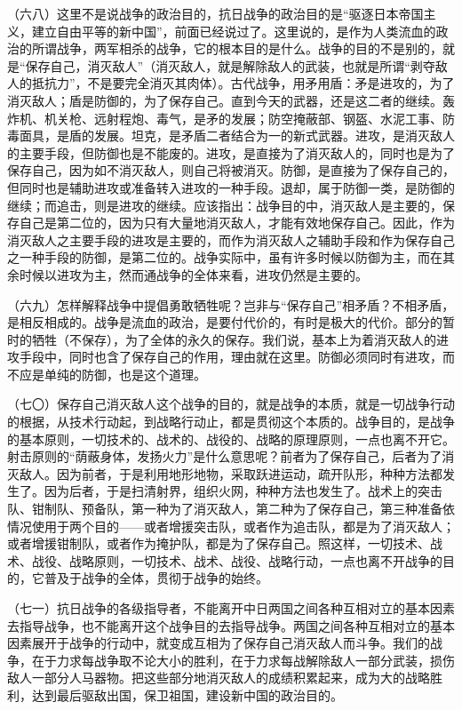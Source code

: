 （六八）这里不是说战争的政治目的，抗日战争的政治目的是“驱逐日本帝国主义，建立自由平等的新中国”，前面已经说过了。这里说的，是作为人类流血的政治的所谓战争，两军相杀的战争，它的根本目的是什么。战争的目的不是别的，就是“保存自己，消灭敌人”（消灭敌人，就是解除敌人的武装，也就是所谓“剥夺敌人的抵抗力”，不是要完全消灭其肉体）。古代战争，用矛用盾：矛是进攻的，为了消灭敌人；盾是防御的，为了保存自己。直到今天的武器，还是这二者的继续。轰炸机、机关枪、远射程炮、毒气，是矛的发展；防空掩蔽部、钢盔、水泥工事、防毒面具，是盾的发展。坦克，是矛盾二者结合为一的新式武器。进攻，是消灭敌人的主要手段，但防御也是不能废的。进攻，是直接为了消灭敌人的，同时也是为了保存自己，因为如不消灭敌人，则自己将被消灭。防御，是直接为了保存自己的，但同时也是辅助进攻或准备转入进攻的一种手段。退却，属于防御一类，是防御的继续；而追击，则是进攻的继续。应该指出：战争目的中，消灭敌人是主要的，保存自己是第二位的，因为只有大量地消灭敌人，才能有效地保存自己。因此，作为消灭敌人之主要手段的进攻是主要的，而作为消灭敌人之辅助手段和作为保存自己之一种手段的防御，是第二位的。战争实际中，虽有许多时候以防御为主，而在其余时候以进攻为主，然而通战争的全体来看，进攻仍然是主要的。

（六九）怎样解释战争中提倡勇敢牺牲呢？岂非与“保存自己”相矛盾？不相矛盾，是相反相成的。战争是流血的政治，是要付代价的，有时是极大的代价。部分的暂时的牺牲（不保存），为了全体的永久的保存。我们说，基本上为着消灭敌人的进攻手段中，同时也含了保存自己的作用，理由就在这里。防御必须同时有进攻，而不应是单纯的防御，也是这个道理。

（七〇）保存自己消灭敌人这个战争的目的，就是战争的本质，就是一切战争行动的根据，从技术行动起，到战略行动止，都是贯彻这个本质的。战争目的，是战争的基本原则，一切技术的、战术的、战役的、战略的原理原则，一点也离不开它。射击原则的“荫蔽身体，发扬火力”是什么意思呢？前者为了保存自己，后者为了消灭敌人。因为前者，于是利用地形地物，采取跃进运动，疏开队形，种种方法都发生了。因为后者，于是扫清射界，组织火网，种种方法也发生了。战术上的突击队、钳制队、预备队，第一种为了消灭敌人，第二种为了保存自己，第三种准备依情况使用于两个目的——或者增援突击队，或者作为追击队，都是为了消灭敌人；或者增援钳制队，或者作为掩护队，都是为了保存自己。照这样，一切技术、战术、战役、战略原则，一切技术、战术、战役、战略行动，一点也离不开战争的目的，它普及于战争的全体，贯彻于战争的始终。

（七一）抗日战争的各级指导者，不能离开中日两国之间各种互相对立的基本因素去指导战争，也不能离开这个战争目的去指导战争。两国之间各种互相对立的基本因素展开于战争的行动中，就变成互相为了保存自己消灭敌人而斗争。我们的战争，在于力求每战争取不论大小的胜利，在于力求每战解除敌人一部分武装，损伤敌人一部分人马器物。把这些部分地消灭敌人的成绩积累起来，成为大的战略胜利，达到最后驱敌出国，保卫祖国，建设新中国的政治目的。

